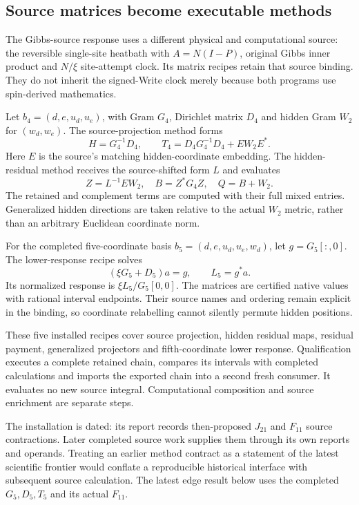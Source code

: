 \subsection{Source matrices become executable methods}

The Gibbs-source response uses a different physical and computational source: the reversible single-site heatbath with $A=N(I-P)$, original Gibbs inner product and $N/\xi$ site-attempt clock. Its matrix recipes retain that source binding. They do not inherit the signed-Write clock merely because both programs use spin-derived mathematics.

Let $b_4=(d,e,u_d,u_e)$, with Gram $G_4$, Dirichlet matrix $D_4$ and hidden Gram $W_2$ for $(w_d,w_e)$. The source-projection method forms
\begin{equation}
 H=G_4^{-1}D_4,\qquad
 T_4=D_4G_4^{-1}D_4+E W_2E^*.
\end{equation}
Here $E$ is the source's matching hidden-coordinate embedding. The hidden-residual method receives the source-shifted form $L$ and evaluates
\begin{equation}
 Z=L^{-1}EW_2,\quad B=Z^*G_4Z,\quad Q=B+W_2.
\end{equation}
The retained and complement terms are computed with their full mixed entries. Generalized hidden directions are taken relative to the actual $W_2$ metric, rather than an arbitrary Euclidean coordinate norm.

For the completed five-coordinate basis $b_5=(d,e,u_d,u_e,w_d)$, let $g=G_5[:,0]$. The lower-response recipe solves
\begin{equation}
 (\xi G_5+D_5)a=g,
 \qquad L_5=g^*a.
\end{equation}
Its normalized response is $\xi L_5/G_5[0,0]$. The matrices are certified native values with rational interval endpoints. Their source names and ordering remain explicit in the binding, so coordinate relabelling cannot silently permute hidden positions.

These five installed recipes cover source projection, hidden residual maps, residual payment, generalized projectors and fifth-coordinate lower response. Qualification executes a complete retained chain, compares its intervals with completed calculations and imports the exported chain into a second fresh consumer. It evaluates no new source integral. Computational composition and source enrichment are separate steps.

The installation is dated: its report records then-proposed $J_{21}$ and $F_{11}$ source contractions. Later completed source work supplies them through its own reports and operands. Treating an earlier method contract as a statement of the latest scientific frontier would conflate a reproducible historical interface with subsequent source calculation. The latest edge result below uses the completed $G_5,D_5,T_5$ and its actual $F_{11}$.

